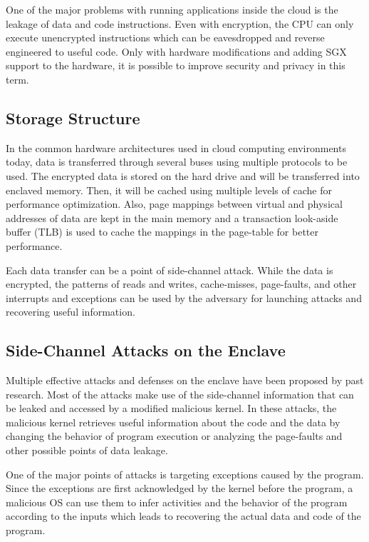 One of the major problems with running applications inside the cloud is the leakage of data and code instructions. Even with encryption, the CPU can only execute unencrypted instructions which can be eavesdropped and reverse engineered to useful code. Only with hardware modifications and adding SGX support to the hardware, it is possible to improve security and privacy in this term.

\subsection{Storage Structure}

In the common hardware architectures used in cloud computing environments today, data is transferred through several buses using multiple protocols to be used. The encrypted data is stored on the hard drive and will be transferred into enclaved memory. Then, it will be cached using multiple levels of cache for performance optimization. Also, page mappings between virtual and physical addresses of data are kept in the main memory and a transaction look-aside buffer (TLB) is used to cache the mappings in the page-table for better performance.

Each data transfer can be a point of side-channel attack. While the data is encrypted, the patterns of reads and writes, cache-misses, page-faults, and other interrupts and exceptions can be used by the adversary for launching attacks and recovering useful information.

\subsection{Side-Channel Attacks on the Enclave}

Multiple effective attacks and defenses on the enclave have been proposed by past research. Most of the attacks make use of the side-channel information that can be leaked and accessed by a modified malicious kernel. In these attacks, the malicious kernel retrieves useful information about the code and the data by changing the behavior of program execution or analyzing the page-faults and other possible points of data leakage.

One of the major points of attacks is targeting exceptions caused by the program. Since the exceptions are first acknowledged by the kernel before the program, a malicious OS can use them to infer activities and the behavior of the program according to the inputs which leads to recovering the actual data and code of the program.

